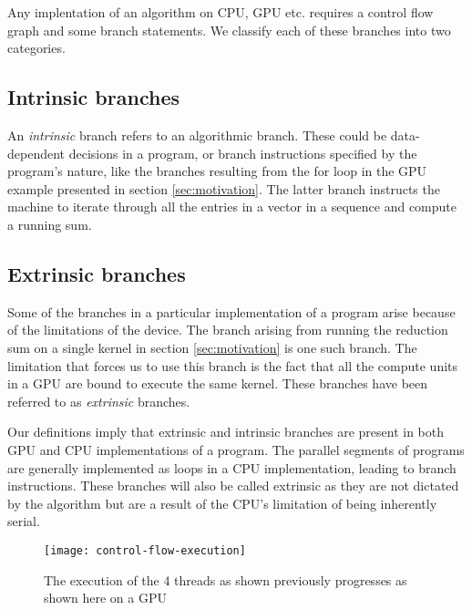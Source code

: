 \label{sec:problem-description}
Any implentation of an algorithm on CPU, GPU etc. requires a control flow graph and some branch statements. We classify each of these branches into two categories.
\subsection{Intrinsic branches}
	An \textit{intrinsic} branch refers to an algorithmic branch. These could be data-dependent decisions in a program, or branch instructions specified by the program's nature, like the branches resulting from the for loop in the GPU example presented in section \ref{sec:motivation}. The latter branch instructs the machine to iterate through all the entries in a vector in a sequence and compute a running sum.

\subsection{Extrinsic branches}
	Some of the branches in a particular implementation of a program arise because of the limitations of the device. The branch arising from running the reduction sum on a single kernel in section \ref{sec:motivation} is one such branch. The limitation that forces us to use this branch is the fact that all the compute units in a GPU are bound to execute the same kernel. These branches have been referred to as \textit{extrinsic} branches.

\par{
	Our definitions imply that extrinsic and intrinsic branches are present in both GPU and CPU implementations of a program. The parallel segments of programs are generally implemented as loops in a CPU implementation, leading to branch instructions. These branches will also be called extrinsic as they are not dictated by the algorithm but are a result of the CPU's limitation of being inherently serial.
}

\begin{figure}
	\centering
	\texttt{[image: control-flow-execution]}
	\caption{The execution of the 4 threads as shown previously progresses as shown here on a GPU
		\label{fig:control-flow-execution}}
\end{figure}

